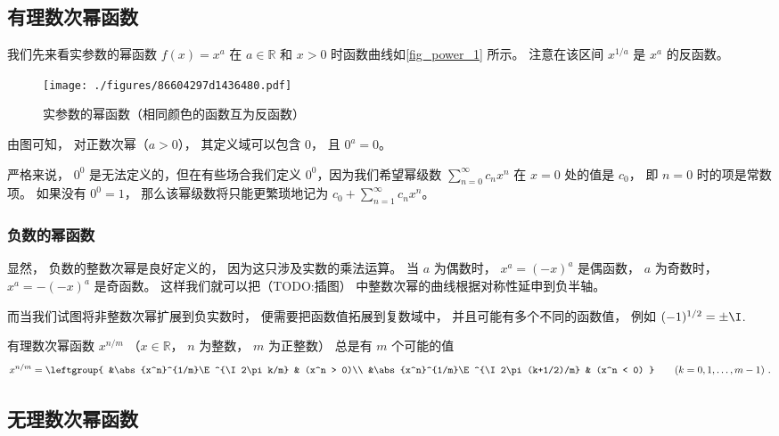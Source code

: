 
\subsection{有理数次幂函数}
我们先来看实参数的幂函数 $f(x) = x^a$ 在 $a\in\mathbb R$ 和 $x > 0$ 时函数曲线如\autoref{fig_power_1} 所示。 注意在该区间 $x^{1/a}$ 是 $x^a$ 的反函数。

\begin{figure}[ht]
\centering
\texttt{[image: ./figures/86604297d1436480.pdf]}
\caption{实参数的幂函数（相同颜色的函数互为反函数）}\label{fig_power_1}
\end{figure}

由图可知， 对正数次幂（$a > 0$）， 其定义域可以包含 $0$， 且 $0^a = 0$。

严格来说， $0^0$ 是无法定义的，但在有些场合我们定义 $0^0$，因为我们希望幂级数 $\sum_{n=0}^\infty c_n x^n$ 在 $x = 0$ 处的值是 $c_0$， 即 $n=0$ 时的项是常数项。 如果没有 $0^0 = 1$， 那么该幂级数将只能更繁琐地记为 $c_0 + \sum_{n=1}^\infty c_n x^n$。

\subsubsection{负数的幂函数}
显然， 负数的整数次幂是良好定义的， 因为这只涉及实数的乘法运算。 当 $a$ 为偶数时， $x^a = (-x)^a$ 是偶函数， $a$ 为奇数时， $x^a = -(-x)^a$ 是奇函数。 这样我们就可以把（TODO:插图） 中整数次幂的曲线根据对称性延申到负半轴。

而当我们试图将非整数次幂扩展到负实数时， 便需要把函数值拓展到复数域中， 并且可能有多个不同的函数值， 例如 $(-1)^{1/2} = \pm\I$. 

有理数次幂函数 $x^{n/m}$ （$x\in \mathbb R$， $n$ 为整数， $m$ 为正整数） 总是有 $m$ 个可能的值
\begin{equation}
x^{n/m} = \leftgroup{
&\abs{x^n}^{1/m}\E^{\I 2\pi k/m} & (x^n > 0)\\
&\abs{x^n}^{1/m}\E^{\I 2\pi (k+1/2)/m} & (x^n < 0)
}\qquad (k = 0,1,\dots, m-1)~.
\end{equation}

\subsection{无理数次幂函数}

